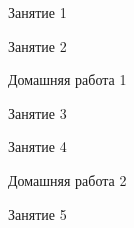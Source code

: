 %
%

\begin{class}[number=1]
	\begin{listofex}
		\item Занятие 1
	\end{listofex}
\end{class}

\begin{class}[number=2]
	\begin{listofex}
		\item Занятие 2
	\end{listofex}
\end{class}

\begin{homework}[number=1]
	\begin{listofex}
		\item Домашняя работа 1
	\end{listofex}
\end{homework}

\begin{class}[number=3]
	\begin{listofex}
		\item Занятие 3 
	\end{listofex}
\end{class}

\begin{class}[number=4]
	\begin{listofex}
		\item Занятие 4
	\end{listofex}
\end{class}

\begin{homework}[number=2]
	\begin{listofex}
		\item Домашняя работа 2
	\end{listofex}
\end{homework}

\begin{class}[number=5]
	\begin{listofex}
		\item Занятие 5
	\end{listofex}
\end{class}

